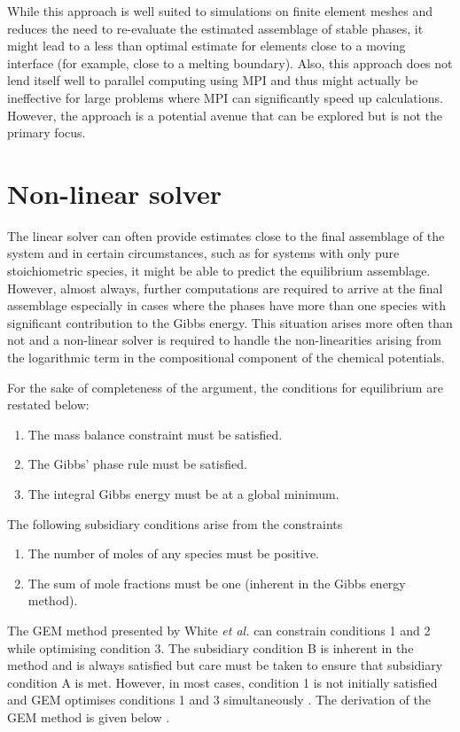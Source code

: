 	While this approach is well suited to simulations on finite element meshes and reduces the need to re-evaluate the estimated assemblage of stable phases, it might lead to a less than optimal estimate for elements close to a moving interface (for example, close to a melting boundary). Also, this approach does not lend itself well to parallel computing using MPI and thus might actually be ineffective for large problems where MPI can significantly speed up calculations. However, the approach is a potential avenue that can be explored but is not the primary focus.

\section{Non-linear solver}
	The linear solver can often provide estimates close to the final assemblage of the system and in certain circumstances, such as for systems with only pure 	stoichiometric species, it might be able to predict the equilibrium assemblage. However, almost always, further computations are required to arrive at the final assemblage especially in cases where the phases have more than one species with significant contribution to the Gibbs energy. This situation arises more often than not and a non-linear solver is required to handle the non-linearities arising from the logarithmic term in the compositional component of the chemical potentials.

	For the sake of completeness of the argument, the conditions for equilibrium are restated below:
	\begin{enumerate}
		\item The mass balance constraint must be satisfied.
		\item The Gibbs' phase rule must be satisfied.
		\item The integral Gibbs energy must be at a global minimum.
	\end{enumerate}

	The following subsidiary conditions arise from the constraints
	\begin{enumerate}[label=\Alph*.]
		\item The number of moles of any species must be positive.
		\item The sum of mole fractions must be one (inherent in the Gibbs energy method).
	\end{enumerate}

	The GEM method presented by White \textit{et al.} \cite{White:58} can constrain conditions 1 and 2 while optimising condition 3.  The subsidiary condition B is inherent in the method and is always satisfied but care must be taken to ensure that subsidiary condition A is met. However, in most cases, condition 1 is not initially satisfied and GEM optimises conditions 1 and 3 simultaneously \cite{Eriksson71}. The derivation of the GEM method is  given below \cite{Piro11b}.

